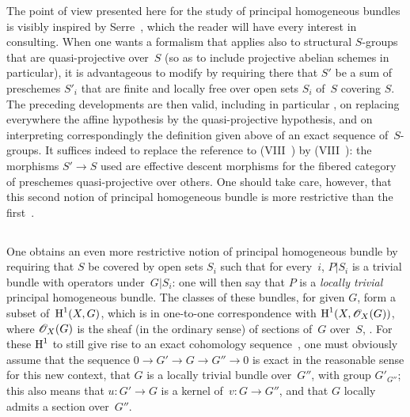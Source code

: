 \begin{remarks}
\label{XI.4.6}
The point of view presented here for the study of principal
homogeneous bundles is visibly inspired by Serre~\cite{XI.7}, which
the reader will have every interest in consulting. When one wants
a formalism that applies also to structural $S$-groups
that are quasi-projective over~$S$ (so as to
include projective abelian schemes in particular), it is
advantageous to modify  by requiring there that $S'$
be a sum of preschemes $S'_i$ that are finite and locally
free over open sets $S_i$ of~$S$ covering $S$. The
preceding developments are then valid, including
in particular , on replacing everywhere the affine hypothesis
by the quasi-projective hypothesis, and on interpreting
correspondingly the definition given above of an
exact sequence of~$S$-groups. It suffices indeed to replace the
reference to (VIII~)
by (VIII~): the morphisms $S'\to S$ used are
effective descent morphisms for the fibered category
of preschemes quasi-projective over others. One should
take care, however, that this second notion of principal
homogeneous bundle is more restrictive than the
first~.
\end{remarks}

\subsection{}
\label{XI.4.7}
One obtains an even more restrictive notion of principal
homogeneous bundle by requiring that $S$ be covered by open sets $S_i$
such that for every~$i$, $P|S_i$ is a trivial bundle with operators
under~$G|S_i$: one will then say that $P$ is a \emph{locally trivial}
principal homogeneous bundle.
The classes of these bundles, for given $G$, form a subset
of~$\operatorname{H}^1(X,G)$, which is in one-to-one correspondence with
$\H^1(X,\cal{O}_X(G))$, where $\cal{O}_X(G)$ is the sheaf (in the
ordinary sense) of sections of~$G$ over~$S$, \cf \cite{XI.2}. For these $\operatorname{H}^1$
to still give rise to an exact cohomology
sequence~, one must obviously assume that the sequence
$0\to G'\to G\to G''\to 0$ is exact in the reasonable sense for this
new context, \ie that $G$ is a locally trivial bundle
over~$G''$, with group $G'_{G''}$; this also means that $u\colon
G'\to G$ is a kernel of~$v\colon G\to G''$, and that $G$ locally admits
a section over~$G''$.

